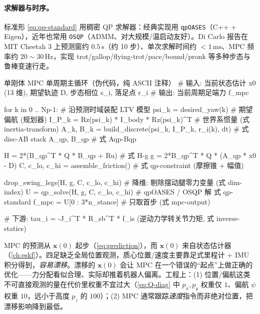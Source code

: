 \paragraph{ 求解器与时序。}
标准形 \cref{eq:qp-standard} 用稠密 QP 求解器：经典实现用 \texttt{qpOASES}（C++ + Eigen）\cite{dicarlo2018cheetah,yu2021quadruped}，近年也常用 \texttt{OSQP}（ADMM、对大规模/温启动友好）。Di Carlo 报告在 MIT Cheetah 3 上预测窗约 $0.5\,\mathrm{s}$（约 10 步）、单次求解时间约 $<1\,\mathrm{ms}$、MPC 频率约 $20\sim30\,\mathrm{Hz}$，实现 trot/gallop/flying-trot/pace/bound/pronk 等多种步态与鲁棒变速行走\cite{dicarlo2018cheetah}。

\begin{codebox}[text]{单刚体 MPC 单周期主循环（伪代码，纯 ASCII 注释）}
# 输入: 当前状态估计 x0 (13 维), 期望轨迹 D, 步态相位 s_i, 落足点 r_i
# 输出: 当前周期足端力 f_mpc

for k in 0 .. Np-1:                     # 沿预测时域装配 LTV 模型
    psi_k   = desired_yaw(k)            # 期望偏航 (规划器)
    I_P_k   = Rz(psi_k) * I_body * Rz(psi_k)^T   # 世界系惯量 (式 inertia-transform)
    A_k, B_k = build_discrete(psi_k, I_P_k, r_i(k), dt)   # 式 disc-AB
stack A_qp, B_qp                        # 式 Aqp-Bqp

H = 2*(B_qp^T * Q * B_qp + Ru)          # 式 H-g
g = 2*B_qp^T * Q * (A_qp * x0 - D)
C, c_lo, c_hi = assemble_friction()     # 式 qp-constraint (摩擦锥 + 幅值)

drop_swing_legs(H, g, C, c_lo, c_hi)    # 降维: 剔除摆动腿零力变量 (式 dim-index)
U = qp_solve(H, g, C, c_lo, c_hi)       # qpOASES / OSQP 解 式 qp-standard
f_mpc = U[0 : 3*n_stance]               # 只取首步 (式 mpc-output)

# 下游: tau_i = -J_i^T * R_sb^T * f_is  (逆动力学转关节力矩, 式 inverse-statics)
\end{codebox}

\begin{pitfall}
MPC 的预测从 $\boldsymbol{x}(0)$ 起步（\cref{eq:prediction}），而 $\boldsymbol{x}(0)$ 来自状态估计器（\cref{ch:eskf}）。四足缺乏全局位置观测，质心位置/速度主要靠足式里程计 + IMU 积分得到，\emph{容易漂移}。漂移的 $\boldsymbol{x}(0)$ 会让 MPC 在一个错误的“起点”上做正确的优化——力分配看似合理、实际却推着机器人偏离。工程上：(1) 位置/偏航这类不可直接观测的量在代价里权重不宜过大（\cref{eq:Q-diag} 中 $p_x,p_y$ 权重仅 $1$、偏航 $\psi$ 权重 $10$，远小于高度 $p_z$ 的 $100$）；(2) MPC 通常跟踪\emph{速度}指令而非绝对位置，把漂移影响降到最低。
\end{pitfall}

